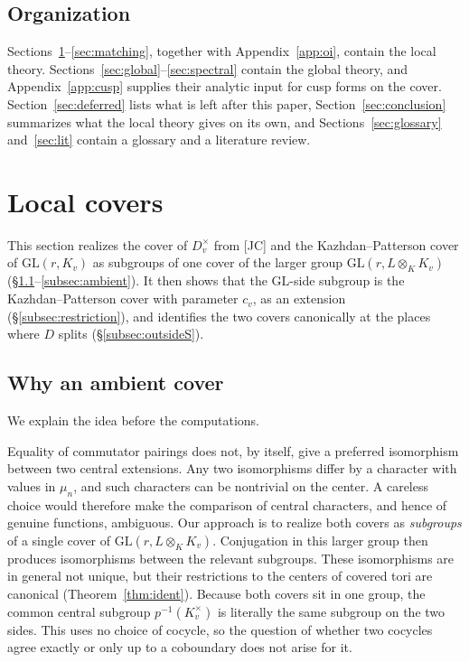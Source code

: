 \documentclass[12pt]{article}
\newcommand{\GL}{\mathrm{GL}}
\theoremstyle{plain}
\theoremstyle{definition}
\begin{document}
\subsection{Organization}
Sections~\ref{sec:covers}--\ref{sec:matching}, together with Appendix~\ref{app:oi}, contain the local theory. Sections~\ref{sec:global}--\ref{sec:spectral} contain the global theory, and Appendix~\ref{app:cusp} supplies their analytic input for cusp forms on the cover. Section~\ref{sec:deferred} lists what is left after this paper, Section~\ref{sec:conclusion} summarizes what the local theory gives on its own, and Sections~\ref{sec:glossary} and~\ref{sec:lit} contain a glossary and a literature review.


\section{Local covers}\label{sec:covers}
This section realizes the cover of $D_v^\times$ from [JC] and the Kazhdan--Patterson cover of $\GL(r,K_v)$ as subgroups of one cover of the larger group $\GL(r,L\otimes_KK_v)$ (\S\ref{subsec:why}--\ref{subsec:ambient}). It then shows that the $\GL$-side subgroup is the Kazhdan--Patterson cover with parameter $c_v$, as an extension (\S\ref{subsec:restriction}), and identifies the two covers canonically at the places where $D$ splits (\S\ref{subsec:outsideS}).

\subsection{Why an ambient cover}\label{subsec:why}
We explain the idea before the computations.

Equality of commutator pairings does not, by itself, give a preferred isomorphism between two central extensions. Any two isomorphisms differ by a character with values in $\mu_n$, and such characters can be nontrivial on the center. A careless choice would therefore make the comparison of central characters, and hence of genuine functions, ambiguous. Our approach is to realize both covers as \emph{subgroups} of a single cover of $\GL(r,L\otimes_KK_v)$. Conjugation in this larger group then produces isomorphisms between the relevant subgroups. These isomorphisms are in general not unique, but their restrictions to the centers of covered tori are canonical (Theorem~\ref{thm:ident}). Because both covers sit in one group, the common central subgroup $p^{-1}(K_v^\times)$ is literally the same subgroup on the two sides. This uses no choice of cocycle, so the question of whether two cocycles agree exactly or only up to a coboundary does not arise for it.
\end{document}
